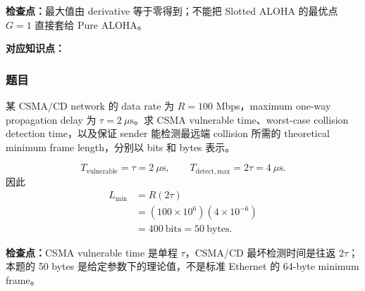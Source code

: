 \textbf{检查点：}最大值由 derivative 等于零得到；不能把 Slotted ALOHA 的最优点 $G=1$ 直接套给 Pure ALOHA。

\clearpage
{}

\textbf{对应知识点：}

\subsubsection*{题目}

某 CSMA/CD network 的 data rate 为 $R=100$ Mbps，maximum one-way propagation delay 为 $\tau=2\ \mu\mathrm{s}$。求 CSMA vulnerable time、worst-case collision detection time，以及保证 sender 能检测最远端 collision 所需的 theoretical minimum frame length，分别以 bits 和 bytes 表示。

\begin{checkedsolution}
\[
  T_{\mathrm{vulnerable}}=\tau=2\ \mu\mathrm{s},
  \qquad
  T_{\mathrm{detect,max}}=2\tau=4\ \mu\mathrm{s}.
\]
因此
\begin{align*}
  L_{\min}
    &=R(2\tau)\\
    &=(100\times10^6)(4\times10^{-6})\\
    &=400\ \text{bits}=50\ \text{bytes}.
\end{align*}
\end{checkedsolution}

\textbf{检查点：}CSMA vulnerable time 是单程 $\tau$，CSMA/CD 最坏检测时间是往返 $2\tau$；本题的 50 bytes 是给定参数下的理论值，不是标准 Ethernet 的 64-byte minimum frame。
